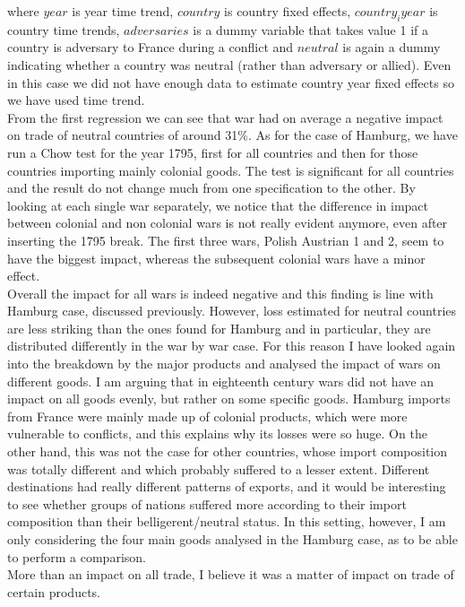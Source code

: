 \documentclass[12pt,a4paper,titlepage,english]{article}
\begin{document}
where $year$ is year time trend, $country$ is country fixed effects, $country_iyear$ is country time trends, $adversaries$ is a dummy variable that takes value 1 if a country is adversary to France during a conflict and $neutral$ is again a dummy indicating whether a country was neutral (rather than adversary or allied). Even in this case we did not have enough data to estimate country year fixed effects so we have used time trend.\\
From the first regression we can see that war had on average a negative impact on trade of neutral countries of around 31\%. As for the case of Hamburg, we have run a Chow test for the year 1795, first for all countries and then for those countries importing mainly colonial goods. The test is significant for all countries and the result do not change much from one specification to the other. 
By looking at each single war separately, we notice that the difference in impact between colonial and non colonial wars is not really evident anymore, even after inserting the 1795 break. The first three wars, Polish Austrian 1 and 2, seem to have the biggest impact, whereas the subsequent colonial wars have a minor effect. \\
Overall the impact for all wars is indeed negative and this finding is line with Hamburg case, discussed previously. However, loss estimated for neutral countries are less striking than the ones found for Hamburg and in particular, they are distributed differently  in the war by war case.
For this reason I have looked again into the breakdown by the major products and analysed the impact of wars on different goods. I am arguing that in eighteenth century wars did not have an impact on all goods evenly, but rather on some specific goods. Hamburg imports from France were mainly made up of colonial products, which were more vulnerable to conflicts, and this explains why its losses were so huge. On the other hand, this was not the case for other countries, whose import composition was totally different and which probably suffered to a lesser extent. Different destinations had really different patterns of exports, and it would be interesting to see whether groups of nations suffered more according to their import composition than their belligerent/neutral status. 
In this setting, however, I am only considering the four main goods analysed in the Hamburg case, as to be able to perform a comparison.\\
More than an impact on all trade, I believe it was a matter of impact on trade of certain products. \\
\end{document}
